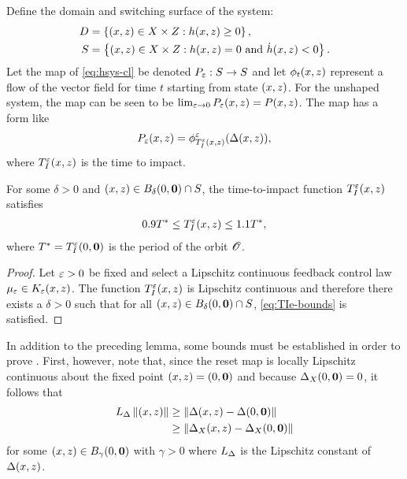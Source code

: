 \documentclass[twocolumn]{article}
\begin{document}
Define the domain and switching surface of the system:
\begin{align}
  D &= \left\{ (x, z) \in X \times Z : h(x, z) \geq 0 \right\},\\
  \nonumber
  S &= \left\{ (x, z) \in X \times Z : h(x, z) = 0 \mbox{ and } {\dot h}(x, z) < 0 \right\}.
\end{align}
Let the \Poincare{} map of \eqref{eq:hsys-cl} be denoted $P_{\varepsilon} : S \to S$ and let $\phi_{t}(x, z)$ represent a flow of the vector field for time $t$ starting from state $(x, z)$.
%
For the unshaped system, the \Poincare{} map can be seen to be $\lim_{\varepsilon \to 0} P_{\varepsilon}(x, z) = P(x, z)$.
%
The \Poincare{} map has a form like
\begin{align}
  P_{\varepsilon}(x, z) = \phi^{\varepsilon}_{T_{I}^{\varepsilon}(x, z)}(\Delta(x, z)),
\end{align}
where $T_{I}^{\varepsilon}(x, z)$ is the time to impact.

\begin{lemma}
  \label{lemma:TIe-bounds}
  For some $\delta > 0$ and $(x, z) \in B_{\delta}(0, {\mathbf 0}) \cap S$, the time-to-impact function $T_{I}^{\varepsilon}(x, z)$ satisfies
  \begin{align}
    \label{eq:TIe-bounds}
    0.9 T^{*} \leq T_{I}^{\varepsilon}(x, z) \leq 1.1 T^{*},
  \end{align}
  where $T^{*} = T_{I}^{\varepsilon}(0, {\mathbf 0})$ is the period of the orbit ${\mathscr O}$.
\end{lemma}
\begin{proof}
  Let $\varepsilon > 0$ be fixed and select a Lipschitz continuous feedback control law $\mu_{\varepsilon} \in K_{\varepsilon}(x, z)$. The function $T_{I}^{\varepsilon}(x, z)$ is Lipschitz continuous and therefore there exists a $\delta > 0$ such that for all $(x, z) \in B_{\delta}(0, {\mathbf 0}) \cap S$, \eqref{eq:TIe-bounds} is satisfied.
\end{proof}

In addition to the preceding lemma, some bounds must be established in order to prove .
%
First, however, note that, since the reset map is locally Lipschitz continuous about the fixed point $(x, z) = (0, {\mathbf 0})$ and because $\Delta_{X}(0, {\mathbf 0}) = 0$, it follows that
\begin{align}
  \label{eq:impact-Lipschitz}
  L_{\Delta} \left\|(x, z)\right\| &\geq \left\| \Delta(x, z) - \Delta(0, {\mathbf 0}) \right\|\\
  \nonumber
  &\geq \left\| \Delta_{X}(x, z) - \Delta_{X}(0, {\mathbf 0}) \right\|
\end{align}
for some $(x, z) \in B_{\gamma}(0, {\mathbf 0})$ with $\gamma > 0$ where $L_{\Delta}$ is the Lipschitz constant of $\Delta(x, z)$.
\end{document}
